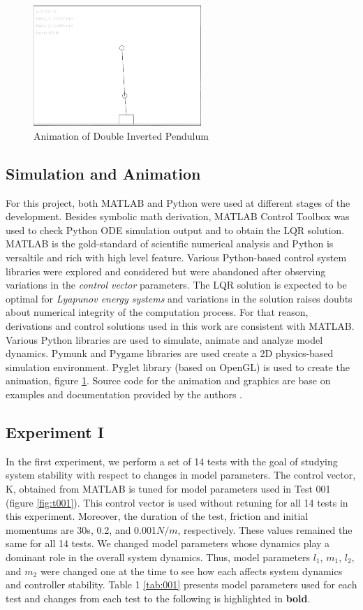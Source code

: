 \documentclass[journal]{IEEEtran}
\begin{document}
\begin{figure}[!t]
    \centering
    \includegraphics[width=2.5in]{fig_000_anim.png}
    \caption{Animation of Double Inverted Pendulum}
    \label{fig_000_anim}
\end{figure}


\subsection{Simulation and Animation}
For this project, both MATLAB and Python were used at different stages of the
development. Besides symbolic math derivation, MATLAB Control Toolbox was used
to check Python ODE simulation output and to obtain the LQR solution. MATLAB is
the gold-standard of scientific numerical analysis and Python is versaltile and
rich with high level feature. Various Python-based control system libraries were
explored and considered but were abandoned after observing variations in the
\emph{control vector} parameters. The LQR solution is expected to be optimal for
\emph{Lyapunov energy systems} and variations in the solution raises doubts
about numerical integrity of the computation process. For that reason, derivations
and control solutions used in this work are consistent with MATLAB.\\
Various Python libraries are used to simulate, animate and analyze model dynamics.
Pymunk and Pygame libraries are used create a 2D physics-based simulation
environment. Pyglet library (based on OpenGL) is used to create the animation,
figure \ref{fig_000_anim}. Source code for the animation and graphics are base
on examples and documentation provided by the authors \cite{pymunk} \cite{pygame}.



\subsection{Experiment I}
In the first experiment, we perform a set of 14 tests with the goal of studying
system stability with respect to changes in model parameters.
The control vector,
K, obtained from MATLAB is tuned for model parameters used in Test 001 (figure
\ref{fig:t001}). This control vector is
used without retuning for all 14 tests in this experiment. Moreover, the duration of the test,
friction and initial momentums are 30s, 0.2, and 0.001\(N/m\), respectively. These
values remained the same for all 14 tests. We changed model parameters whose
dynamics play a dominant role in the overall system dynamics. Thus, model
parameters \(l_1\), \(m_1\), \(l_2\), and \(m_2\) were changed one at the time
to see how each affects system dynamics and controller stability.
Table 1 \ref{tab:001} presents model parameters used for each test and changes
from each test to the following is highlighted in \textbf{bold}.
\end{document}
